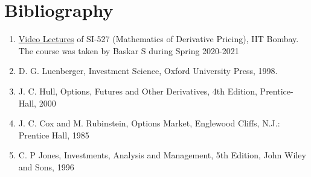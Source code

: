 \documentclass{report}
\begin{document}
\clearpage
\section*{Bibliography}
\begin{enumerate}
    \item \href{https://www.youtube.com/playlist?list=PLjAj1Z92T7LTcyjV-Di2_a4mij9_5fKkM}{Video Lectures} of SI-527 (Mathematics of Derivative Pricing), IIT Bombay. The course was taken by Baskar S during Spring 2020-2021
    \item D. G. Luenberger, Investment Science, Oxford University Press, 1998.
    \item J. C. Hull, Options, Futures and Other Derivatives, 4th Edition, Prentice-Hall, 2000
    \item J. C. Cox and M. Rubinstein, Options Market, Englewood Cliffs, N.J.: Prentice Hall, 1985
    \item C. P Jones, Investments, Analysis and Management, 5th Edition, John Wiley and Sons, 1996
\end{enumerate}
\end{document}
